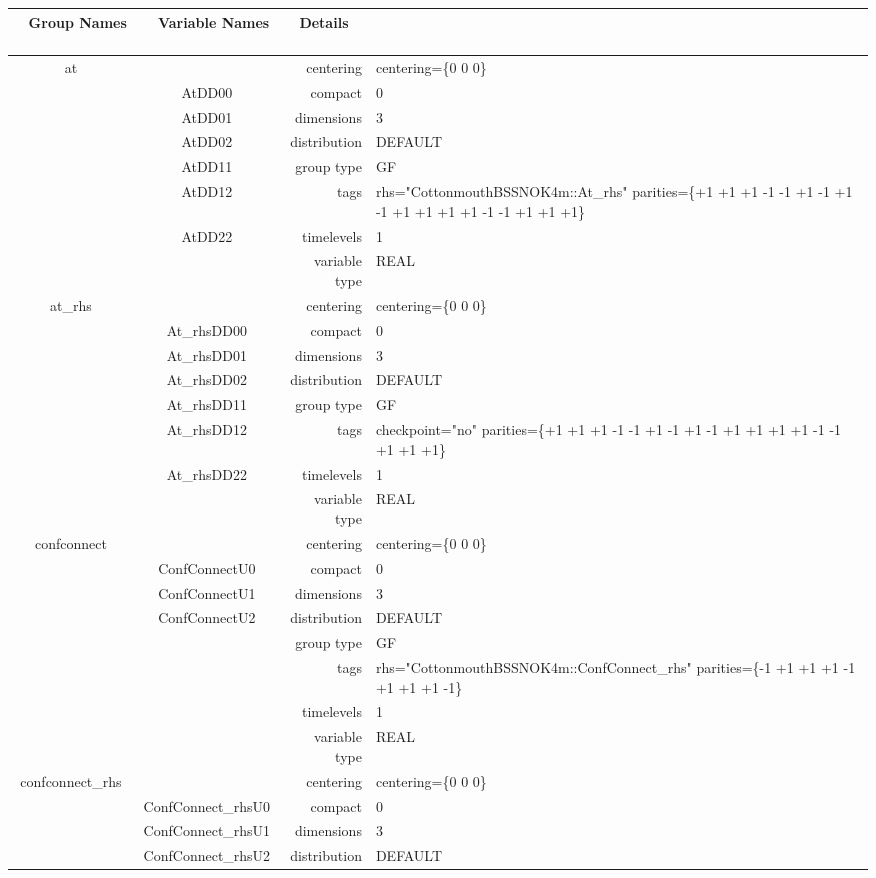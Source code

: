 \begin{tabular*}{150mm}{|c|c@{\extracolsep{\fill}}|rl|} \hline 
~ {\bf Group Names} ~ & ~ {\bf Variable Names} ~  &{\bf Details} ~ & ~\\ 
\hline 
at &  & centering & centering=\{0 0 0\} \\ 
 & AtDD00 & compact & 0 \\ 
 & AtDD01 & dimensions & 3 \\ 
 & AtDD02 & distribution & DEFAULT \\ 
 & AtDD11 & group type & GF \\ 
 & AtDD12 & tags & rhs="CottonmouthBSSNOK4m::At\_rhs" parities=\{+1 +1 +1  -1 -1 +1  -1 +1 -1  +1 +1 +1  +1 -1 -1  +1 +1 +1\} \\ 
 & AtDD22 & timelevels & 1 \\ 
 &  & variable type & REAL \\ 
\hline 
at\_rhs &  & centering & centering=\{0 0 0\} \\ 
 & At\_rhsDD00 & compact & 0 \\ 
 & At\_rhsDD01 & dimensions & 3 \\ 
 & At\_rhsDD02 & distribution & DEFAULT \\ 
 & At\_rhsDD11 & group type & GF \\ 
 & At\_rhsDD12 & tags & checkpoint="no" parities=\{+1 +1 +1  -1 -1 +1  -1 +1 -1  +1 +1 +1  +1 -1 -1  +1 +1 +1\} \\ 
 & At\_rhsDD22 & timelevels & 1 \\ 
 &  & variable type & REAL \\ 
\hline 
confconnect &  & centering & centering=\{0 0 0\} \\ 
 & ConfConnectU0 & compact & 0 \\ 
 & ConfConnectU1 & dimensions & 3 \\ 
 & ConfConnectU2 & distribution & DEFAULT \\ 
 &  & group type & GF \\ 
 &  & tags & rhs="CottonmouthBSSNOK4m::ConfConnect\_rhs" parities=\{-1 +1 +1  +1 -1 +1  +1 +1 -1\} \\ 
 &  & timelevels & 1 \\ 
 &  & variable type & REAL \\ 
\hline 
confconnect\_rhs &  & centering & centering=\{0 0 0\} \\ 
 & ConfConnect\_rhsU0 & compact & 0 \\ 
 & ConfConnect\_rhsU1 & dimensions & 3 \\ 
 & ConfConnect\_rhsU2 & distribution & DEFAULT \\ 

\end{tabular*}
